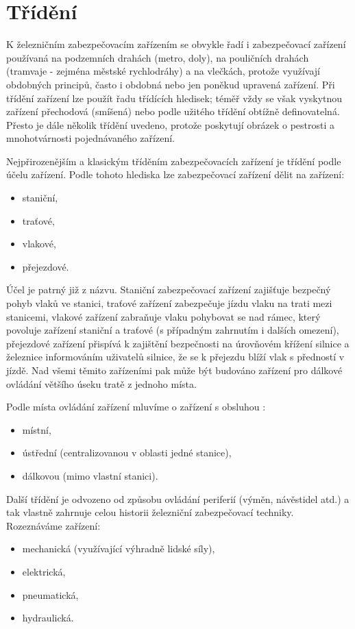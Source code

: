 {\section{Třídění}
  K železničním zabezpečovacím zařízením se obvykle řadí i zabezpečovací zařízení používaná na
  podzemních drahách (metro, doly), na pouličních drahách (tramvaje - zejména městské rychlodráhy) 
  a na vlečkách, protože využívají obdobných principů, často i obdobná nebo jen poněkud upravená 
  zařízení. Při třídění zařízení lze použít řadu třídících hledisek; téměř vždy se však vyskytnou 
  zařízení přechodová (smíšená) nebo podle užitého třídění obtížně definovatelná. Přesto je dále 
  několik třídění uvedeno, protože poskytují obrázek o pestrosti a mnohotvárnosti pojednávaného 
  zařízení. 
  
  Nejpřirozenějším a klasickým tříděním zabezpečovacích zařízení je třídění podle účelu zařízení.
  Podle tohoto hlediska lze zabezpečovací zařízení dělit na zařízení: 
  \begin{itemize}
    \item staniční,
    \item traťové,
    \item vlakové,
    \item přejezdové. 
  \end{itemize}
  Účel je patrný již z názvu. Staniční zabezpečovací zařízení zajišťuje bezpečný pohyb vlaků ve 
  stanici, traťové zařízení zabezpečuje jízdu vlaku na trati mezi stanicemi, vlakové zařízení 
  zabraňuje vlaku pohybovat se nad rámec, který povoluje zařízení staniční a traťové (s případným 
  zahrnutím i dalších omezení), přejezdové zařízení přispívá k zajištění bezpečnosti na úrovňovém 
  křížení silnice a železnice informováním uživatelů silnice, že se k přejezdu blíží vlak s 
  předností v jízdě. Nad všemi těmito zařízeními pak může být budováno zařízení pro dálkové 
  ovládání většího úseku tratě z jednoho místa. 
  
  Podle místa ovládání zařízení mluvíme o zařízení s obsluhou :
    \begin{itemize}
    \item místní,
    \item ústřední (centralizovanou v oblasti jedné stanice),
    \item dálkovou (mimo vlastní stanici).
  \end{itemize}

  Další třídění je odvozeno od způsobu ovládání periferií (výměn, návěstidel atd.) a tak vlastně
  zahrnuje celou historii železniční zabezpečovací techniky. Rozeznáváme zařízení:
  \begin{itemize}
    \item mechanická (využívající výhradně lidské síly),
    \item elektrická,
    \item pneumatická,
    \item hydraulická. 
  \end{itemize}

}

